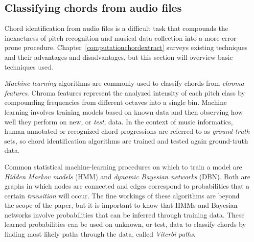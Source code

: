 \subsection{Classifying chords from audio files}

Chord identification from audio files is a difficult task that compounds the inexactness of pitch recognition and musical data collection into a more error-prone procedure. Chapter~\ref{computationchordextract} surveys existing techniques and their advantages and disadvantages, but this section will overview basic techniques used.

\textit{Machine learning} algorithms are commonly used to classify chords from \textit{chroma features}. Chroma features represent the analyzed intensity of each pitch class by compounding frequencies from different octaves into a single bin. Machine learning involves training models based on known data and then observing how well they perform on new, or \textit{test}, data. In the context of music informatics, human-annotated or recognized chord progressions are referred to as \textit{ground-truth} sets\cite{BurgoyneEtAl_2011_AnExpeGrouSet}, so chord identification algorithms are trained and tested again ground-truth data.

Common statistical machine-learning procedures on which to train a model are \textit{Hidden Markov models} (HMM) and \textit{dynamic Bayesian networks} (DBN). Both are graphs in which nodes are connected and edges correspond to probabilities that a certain \textit{transition} will occur. The fine workings of these algorithms are beyond the scope of the paper, but it is important to know that HMMs and Bayesian networks involve probabilities that can be inferred through training data. These learned probabilities can be used on unknown, or test, data to classify chords by finding most likely paths through the data, called \textit{Viterbi paths}.